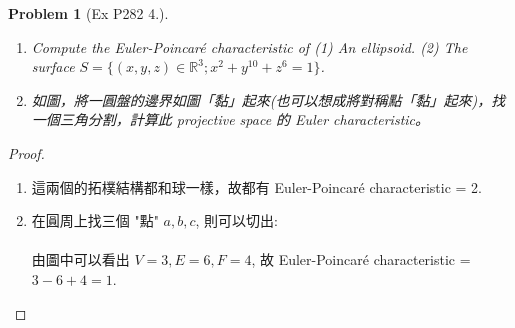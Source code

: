 \documentclass[10pt,a4paper]{article}
\newcounter{theProblemCounter}
\newtheorem{problem}[theProblemCounter]{Problem}
\begin{document}
\setcounter{theProblemCounter}{9}
\begin{problem}[Ex P282 4.]\hspace*{0em}
\begin{enumerate}
\item[(a)] Compute the Euler-Poincar\'e characteristic of (1) An ellipsoid. (2) The surface $S=\{(x, y, z)\in \mathbb{R}^3; x^2+y^{10}+z^6=1\}$.
\item[(b)] 如圖，將一圓盤的邊界如圖「黏」起來(也可以想成將對稱點「黏」起來)，找一個三角分割，計算此 projective space 的 Euler characteristic。
\end{enumerate}
\end{problem}
\begin{proof}
\begin{enumerate}
\item[(a)]
這兩個的拓樸結構都和球一樣，故都有 Euler-Poincar\'e characteristic = 2.
\item[(b)]
在圓周上找三個 "點" $a, b, c$, 則可以切出:\\
\\
由圖中可以看出 $V=3, E=6, F=4$, 故 Euler-Poincar\'e characteristic = $3-6+4 = 1$.
\end{enumerate}
\end{proof}
\end{document}
